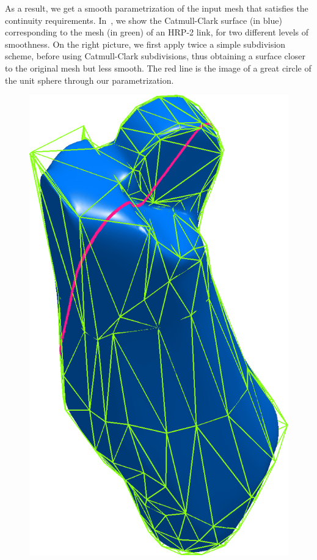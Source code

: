As a result, we get a smooth parametrization of the input mesh that satisfies the continuity requirements.
In~, we show the Catmull-Clark surface (in blue) corresponding to the mesh (in green) of an HRP-2 link, for two different levels of smoothness.
On the right picture, we first apply twice a simple subdivision scheme, before using Catmull-Clark subdivisions, thus obtaining a surface closer to the original mesh but less smooth.
The red line is the image of a great circle of the unit sphere through our parametrization.
\begin{figure}
  \centering
    \includegraphics[width = 0.2\paperwidth]{leg3smooth.png}

\end{figure}
